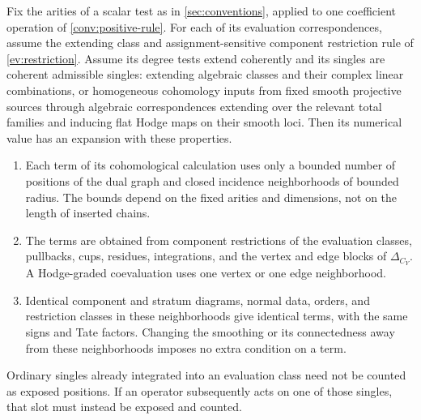 \begin{proposition}\label{fp:local-algebra}
Fix the arities of a scalar test as in \cref{sec:conventions}, applied to
one coefficient operation of \cref{conv:positive-rule}.
For each of its evaluation correspondences, assume the extending class and
assignment-sensitive component restriction rule of \cref{ev:restriction}.
Assume its degree tests extend coherently and its singles are coherent
admissible singles: extending algebraic classes and their complex linear
combinations, or homogeneous cohomology inputs from fixed smooth projective
sources through algebraic correspondences extending over the relevant total
families and inducing flat Hodge maps on their smooth loci.
Then its numerical value has an expansion with these properties.
\begin{enumerate}[label=\textup{(\roman*)}]
\item Each term of its cohomological calculation uses only a bounded number
of positions of the dual graph and closed incidence neighborhoods of bounded
radius.  The bounds depend on the fixed arities and dimensions, not on the
length of inserted chains.
\item The terms are obtained from component restrictions of the evaluation
classes, pullbacks, cups, residues, integrations, and the vertex and edge
blocks of $\Delta_{C_Y}$.  A Hodge-graded coevaluation uses one vertex or one
edge neighborhood.
\item Identical component and stratum diagrams, normal data, orders, and
restriction classes in these neighborhoods give identical terms, with the
same signs and Tate factors.  Changing the smoothing or its connectedness
away from these neighborhoods imposes no extra condition on a term.
\end{enumerate}
Ordinary singles already integrated into an evaluation class need not be
counted as exposed positions.  If an operator subsequently acts on one of
those singles, that slot must instead be exposed and counted.
\end{proposition}

